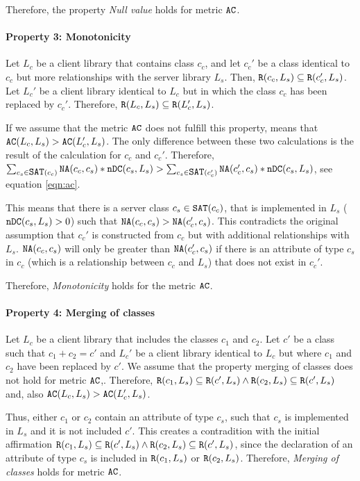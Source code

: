 Therefore, the property \textit{Null value} holds for metric $\verb|AC|$.

\paragraph{Property 3: Monotonicity}
Let $L_c$ be a client library that contains class $c_c$, and let $c_c'$ be a class identical to $c_c$ but more relationships with the server library $L_s$. Then, $\verb|R|(c_c, L_s) \subseteq \verb|R|(c_c', L_s)$. Let $L_c'$ be a client library identical to $L_c$ but in which the class $c_c$ has been replaced by $c_c'$. Therefore, $\verb|R|(L_c, L_s) \subseteq \verb|R|(L_c', L_s)$.

If we assume that the metric $\verb|AC|$ does not fulfill this property, means that $\verb|AC|(L_c, L_s) > \verb|AC|(L_c', L_s)$. The only difference between these two calculations is the result of the calculation for $c_c$ and $c_c'$. Therefore, $\sum_{c_s \in \verb|SAT|(c_c)} \verb|NA|(c_c, c_s) * \verb|nDC|(c_s, L_s) > \sum_{c_s \in \verb|SAT|(c_c')} \verb|NA|(c_c', c_s) * \verb|nDC|(c_s, L_s)$, see equation \ref{eqn:ac}.

This means that there is a server class $c_s \in \verb|SAT|(c_c)$, that is implemented in $L_s$ ($\verb|nDC|(c_s, L_s) > 0$) such that $\verb|NA|(c_c, c_s) > \verb|NA|(c_c', c_s)$. This contradicts the original assumption that $c_c'$ is constructed from $c_c$ but with additional relationships with $L_s$. $\verb|NA|(c_c, c_s)$ will only be greater than $\verb|NA|(c_c', c_s)$ if there is an attribute of type $c_s$ in $c_c$ (which is a relationship between $c_c$ and $L_s$) that does not exist in $c_c'$.

Therefore, \textit{Monotonicity} holds for the metric $\verb|AC|$.

\paragraph{Property 4: Merging of classes}
Let $L_c$ be a client library that includes the classes $c_1$ and $c_2$. Let $c'$ be a class such that $c_1 + c_2 = c'$ and $L_c'$ be a client library identical to $L_c$ but where $c_1$ and $c_2$ have been replaced by $c'$. We assume that the property merging of classes does not hold for metric $\verb|AC|$,. Therefore, $\verb|R|(c_1, L_s) \subseteq \verb|R|(c', L_s) \land \verb|R|(c_2, L_s) \subseteq \verb|R|(c', L_s)$ and, also $\verb|AC|(L_c, L_s) > \verb|AC|(L_c', L_s)$.

Thus, either $c_1$ or $c_2$ contain an attribute of type $c_s$, such that $c_s$ is implemented in $L_s$ and it is not included $c'$. This creates a contradition with the initial affirmation $\verb|R|(c_1, L_s) \subseteq \verb|R|(c', L_s) \land \verb|R|(c_2, L_s) \subseteq \verb|R|(c', L_s)$, since the declaration of an attribute of type $c_s$ is included in $\verb|R|(c_1, L_s)$ or $\verb|R|(c_2, L_s)$. Therefore, \textit{Merging of classes} holds for metric $\verb|AC|$.

